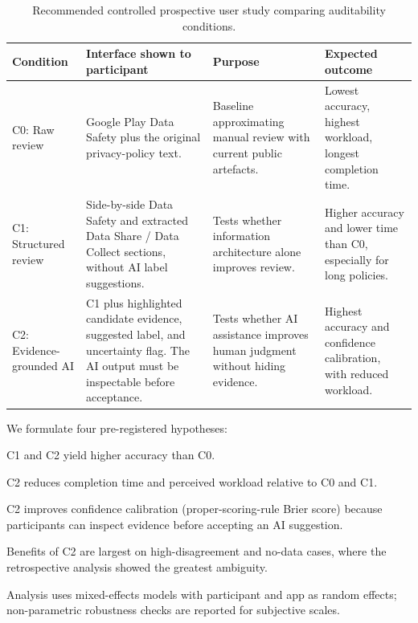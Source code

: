 \documentclass[11pt,a4paper]{article}
\begin{document}
\begin{table}[t]
\centering\small
\caption{Recommended controlled prospective user study comparing
auditability conditions.}
\label{tab:user-study}
\begin{tabular}{p{}p{}p{}p{}}
\toprule
Condition & Interface shown to participant & Purpose & Expected outcome \\
\midrule
C0: Raw review &
Google Play Data Safety plus the original privacy-policy text. &
Baseline approximating manual review with current public artefacts. &
Lowest accuracy, highest workload, longest completion time. \\[2pt]
C1: Structured review &
Side-by-side Data Safety and extracted Data Share / Data Collect
sections, without AI label suggestions. &
Tests whether information architecture alone improves review. &
Higher accuracy and lower time than C0, especially for long policies. \\[2pt]
C2: Evidence-grounded AI &
C1 plus highlighted candidate evidence, suggested label, and uncertainty
flag. The AI output must be inspectable before acceptance. &
Tests whether AI assistance improves human judgment without hiding
evidence. &
Highest accuracy and confidence calibration, with reduced workload. \\
\bottomrule
\end{tabular}
\end{table}

We formulate four pre-registered hypotheses:
\begin{description}[leftmargin=*,nosep,topsep=2pt]
\item[H1.] C1 and C2 yield higher accuracy than C0.
\item[H2.] C2 reduces completion time and perceived workload relative
to C0 and C1.
\item[H3.] C2 improves confidence calibration (proper-scoring-rule
Brier score) because participants can inspect evidence before
accepting an AI suggestion.
\item[H4.] Benefits of C2 are largest on high-disagreement and
no-data cases, where the retrospective analysis showed the greatest
ambiguity.
\end{description}
Analysis uses mixed-effects models with participant and app as random
effects; non-parametric robustness checks are reported for subjective
scales.
\end{document}

